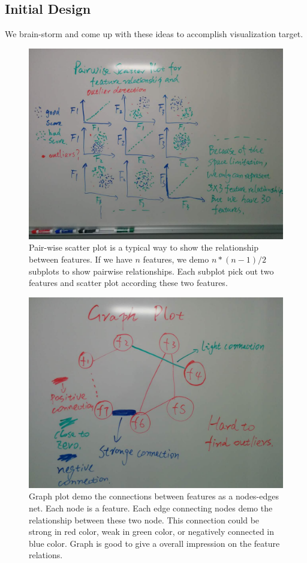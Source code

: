 \documentclass{article}
\begin{document}
\subsection{Initial Design}
We brain-storm and come up with these ideas to accomplish visualization target.

\begin{figure}[H]
\centering
\includegraphics[scale=0.23]{pairwise_scatter.jpg}
\caption{Pair-wise scatter plot is a typical way to show the relationship between features. If we have $n$ features, we demo $n*(n-1)/2$ subplots to show pairwise relationships. Each subplot pick out two features and scatter plot according these two features.}
\end{figure}

\begin{figure}[H]
\centering
\includegraphics[scale=0.23]{graph.jpg}
\caption{Graph plot demo the connections between features as a nodes-edges net. Each node is a feature. Each edge connecting nodes demo the relationship between these two node. This connection could be strong in red color, weak in green color, or negatively connected in blue color. Graph is good to give a overall impression on the feature relations.}
\end{figure}
\end{document}
